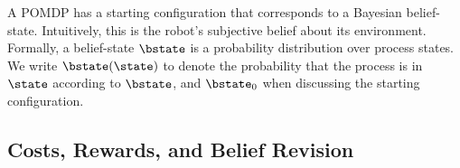 A POMDP has a starting configuration that corresponds to a Bayesian
belief-state. Intuitively, this is the robot's subjective belief about
its environment. Formally, a belief-state $\bstate$ is a probability
distribution over process states. We write $\bstate(\state)$ to denote
the probability that the process is in $\state$ according to
$\bstate$, and $\bstate_0$ when discussing the starting
configuration. 



\subsection{Costs, Rewards, and Belief Revision}


